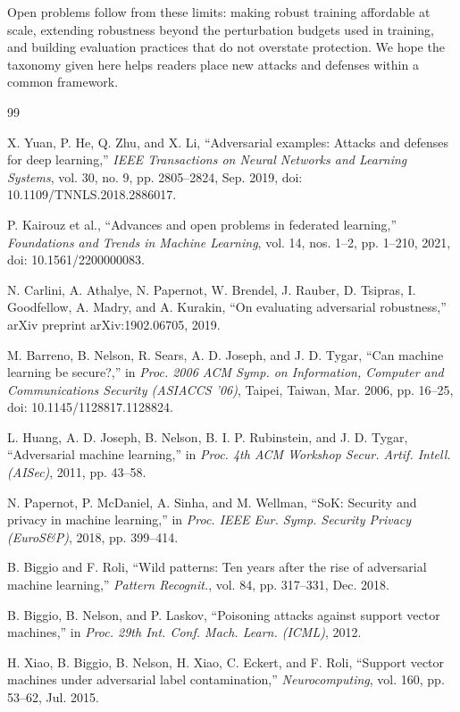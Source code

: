 \documentclass[12pt]{article}
\begin{document}
Open problems follow from these limits: making robust training affordable at scale, extending robustness beyond the perturbation budgets used in training, and building evaluation practices that do not overstate protection. We hope the taxonomy given here helps readers place new attacks and defenses within a common framework.

\begin{thebibliography}{99}

 X. Yuan, P. He, Q. Zhu, and X. Li, ``Adversarial examples: Attacks and defenses for deep learning,'' \textit{IEEE Transactions on Neural Networks and Learning Systems}, vol. 30, no. 9, pp. 2805--2824, Sep. 2019, doi: 10.1109/TNNLS.2018.2886017.

 P. Kairouz et al., ``Advances and open problems in federated learning,'' \textit{Foundations and Trends in Machine Learning}, vol. 14, nos. 1--2, pp. 1--210, 2021, doi: 10.1561/2200000083.

 N. Carlini, A. Athalye, N. Papernot, W. Brendel, J. Rauber, D. Tsipras, I. Goodfellow, A. Madry, and A. Kurakin, ``On evaluating adversarial robustness,'' arXiv preprint arXiv:1902.06705, 2019.

 M. Barreno, B. Nelson, R. Sears, A. D. Joseph, and J. D. Tygar, ``Can machine learning be secure?,'' in \textit{Proc. 2006 ACM Symp. on Information, Computer and Communications Security (ASIACCS '06)}, Taipei, Taiwan, Mar. 2006, pp. 16--25, doi: 10.1145/1128817.1128824.

 L. Huang, A. D. Joseph, B. Nelson, B. I. P. Rubinstein, and J. D. Tygar, ``Adversarial machine learning,'' in \textit{Proc. 4th ACM Workshop Secur. Artif. Intell. (AISec)}, 2011, pp. 43--58.

 N. Papernot, P. McDaniel, A. Sinha, and M. Wellman, ``SoK: Security and privacy in machine learning,'' in \textit{Proc. IEEE Eur. Symp. Security Privacy (EuroS\&P)}, 2018, pp. 399--414.

 B. Biggio and F. Roli, ``Wild patterns: Ten years after the rise of adversarial machine learning,'' \textit{Pattern Recognit.}, vol. 84, pp. 317--331, Dec. 2018.

 B. Biggio, B. Nelson, and P. Laskov, ``Poisoning attacks against support vector machines,'' in \textit{Proc. 29th Int. Conf. Mach. Learn. (ICML)}, 2012.

 H. Xiao, B. Biggio, B. Nelson, H. Xiao, C. Eckert, and F. Roli, ``Support vector machines under adversarial label contamination,'' \textit{Neurocomputing}, vol. 160, pp. 53--62, Jul. 2015.


\end{thebibliography}
\end{document}
